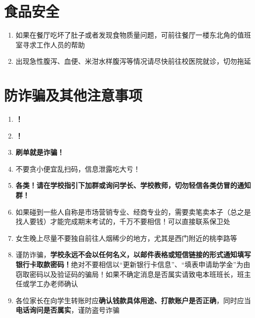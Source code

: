 \section[食品安全]{食品安全}
\begin{enumerate}
    \item 如果在餐厅吃坏了肚子或者发现食物质量问题，可前往餐厅一楼东北角的值班室寻求工作人员的帮助
    \item 出现急性腹泻、血便、米泔水样腹泻等情况请尽快前往校医院就诊，切勿拖延
\end{enumerate}

\section[防诈骗及其他注意事项]{防诈骗及其他注意事项}
\begin{enumerate}
    \item \textbf{！}
    \item \textbf{！}
    \item \textbf{刷单就是诈骗！}
    \item 不要贪小便宜乱扫码，信息泄露吃大亏！
    \item \textbf{各类！请在学校指引下加群或询问学长、学校教师，切勿轻信各类仿冒的通知群！}
    \item 如果碰到一些人自称是市场营销专业、经商专业的，需要卖笔卖本子\footnotemark （总之是找人要钱）才能完成期末考试的，千万不要相信！可以直接联系保卫处
    \item 女生晚上尽量不要独自前往人烟稀少的地方，尤其是西门附近的桃李路等
    \item 谨防诈骗，\textbf{学校永远不会以任何名义，以邮件表格或短信链接的形式通知填写银行卡取款密码！}绝对不要相信以“更新银行卡信息”、“填表申请助学金”为由窃取密码以及验证码的骗局！如果不确定消息是否属实请致电本班班长，班主任或学工办老师确认
    \item 各位家长在向学生转账时应\textbf{确认钱款具体用途、打款账户是否正确}，同时应当\textbf{电话询问是否属实}，谨防盗号诈骗
\end{enumerate}
